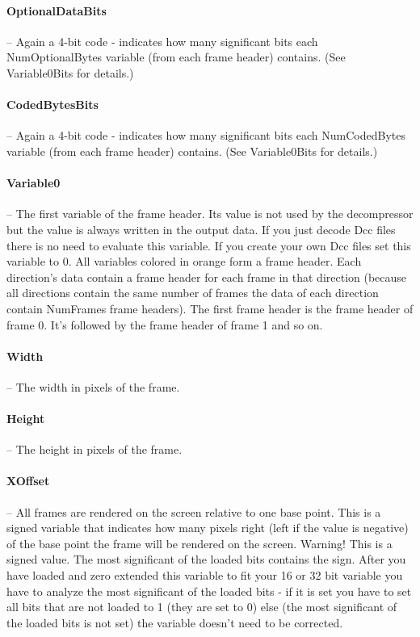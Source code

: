 \paragraph{OptionalDataBits} -- Again a 4-bit code - indicates how many 
significant bits each NumOptionalBytes variable (from each frame header) 
contains. (See Variable0Bits for details.)	

\paragraph{CodedBytesBits} -- Again a 4-bit code - indicates how many 
significant bits each NumCodedBytes variable (from each frame header) contains. 
(See Variable0Bits for details.)	

\paragraph{Variable0} -- The first variable of the frame header. Its value is 
not used by the decompressor but the value is always written in the output data. 
If you just decode Dcc files there is no need to evaluate this variable. If you 
create your own Dcc files set this variable to 0.	
All variables colored in orange form a frame header. Each direction's data 
contain a frame header for each frame in that direction (because all directions 
contain the same number of frames the data of each direction contain NumFrames 
frame headers). The first frame header is the frame header of frame 0. It's 
followed by the frame header of frame 1 and so on.	

\paragraph{Width} -- The width in pixels of the frame.	

\paragraph{Height} -- The height in pixels of the frame.	

\paragraph{XOffset} -- All frames are rendered on the screen relative to one 
base point. This is a signed variable that indicates how many pixels right (left 
if the value is negative) of the base point the frame will be rendered on the 
screen. Warning! This is a signed value. The most significant of the loaded bits 
contains the sign. After you have loaded and zero extended this variable to fit 
your 16 or 32 bit variable you have to analyze the most significant of the 
loaded bits - if it is set you have to set all bits that are not loaded to 1 
(they are set to 0) else (the most significant of the loaded bits is not set) 
the variable doesn't need to be corrected.	

